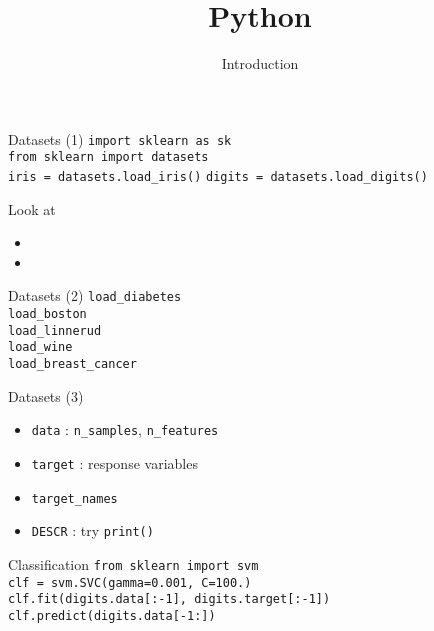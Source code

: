 
\title{Python}
\subtitle{Introduction}




\begin{frame}
  \titlepage
\end{frame}

\begin{frame}{}
\end{frame}

\begin{frame}{Datasets (1)}
  \texttt{import sklearn as sk}\\
  \texttt{from sklearn import datasets}\\[2mm]
  \texttt{iris = datasets.load\_iris()}
  \texttt{digits = datasets.load\_digits()}

  \bigskip
  Look at
  \begin{itemize}
  \item  {}
  \item  {}
  \end{itemize}
\end{frame}

\begin{frame}{Datasets (2)}
  \texttt{load\_diabetes}\\
  \texttt{load\_boston}\\
  \texttt{load\_linnerud}\\
  \texttt{load\_wine}\\
  \texttt{load\_breast\_cancer}
\end{frame}

\begin{frame}{Datasets (3)}
  \begin{itemize}
  \item \texttt{data} : \texttt{n\_samples}, \texttt{n\_features}
  \item \texttt{target} : response variables
  \item \texttt{target\_names}
  \item \texttt{DESCR} : try \texttt{print()}
  \end{itemize}
\end{frame}

\begin{frame}{Classification}
  \texttt{from sklearn import svm}\\[1mm]
  \texttt{clf = svm.SVC(gamma=0.001, C=100.)}\\
  \texttt{clf.fit(digits.data[:-1], digits.target[:-1])}\\
  \texttt{clf.predict(digits.data[-1:])}
\end{frame}

